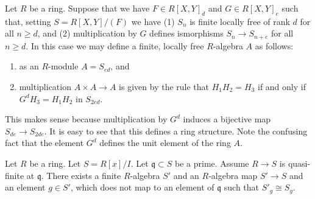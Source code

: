 \begin{remark}
\label{remark-algebra}
Let $R$ be a ring. Suppose that we have $F \in R[X,Y]_d$
and $G \in R[X,Y]_e$ such that, setting $S = R[X,Y]/(F)$
we have (1) $S_n$ is finite locally free of rank $d$ for
all $n \geq d$, and (2) multiplication by $G$ defines
ismorphisms $S_n \to S_{n+e}$ for all $n \geq d$. In this
case we may define a finite, locally free $R$-algebra
$A$ as follows:
\begin{enumerate}
\item as an $R$-module $A = S_{ed}$, and
\item multiplication $A \times A \to A$ is given by
the rule that $H_1 H_2 = H_3$ if and only if $G^d H_3 = H_1 H_2$
in $S_{2ed}$.
\end{enumerate}
This makes sense because multiplication by $G^d$
induces a bijective map $S_{de} \to S_{2de}$.
It is easy to see that this defines a ring structure.
Note the confusing fact that the element $G^d$
defines the unit element of the ring $A$.
\end{remark}

\begin{lemma}
\label{lemma-quasi-finite-monogenic}
Let $R$ be a ring. Let $S = R[x]/I$.
Let $\mathfrak q \subset S$ be a prime.
Assume $R \to S$ is quasi-finite at $\mathfrak q$.
There exists a finite $R$-algebra $S'$ and an
$R$-algebra map $S' \to S$ and an element
$g \in S'$, which does not map to an
element of $\mathfrak q$ such that
$S'_g \cong S_g$.
\end{lemma}

